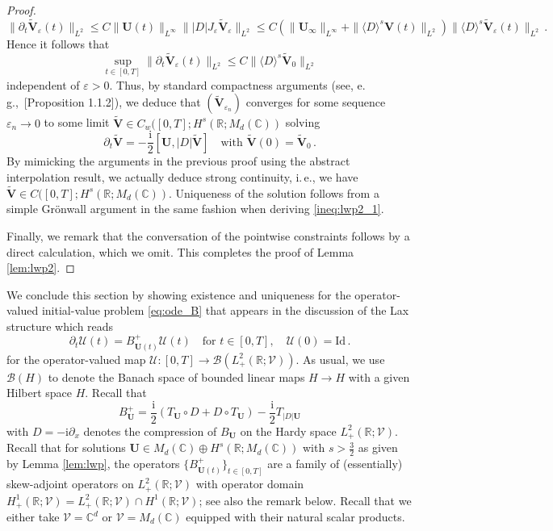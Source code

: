 \documentclass[11pt,reqno]{amsart}
\theoremstyle{definition}
\theoremstyle{remark}
\theoremstyle{remark}
\numberwithin{equation}{section}
\newcommand{\C}{\mathbb{C}}
\newcommand{\R}{\mathbb{R}}
\newcommand{\UU}{\mathcal{U}}
\newcommand{\VV}{\mathcal{V}}
\newcommand{\pt}{\partial}
\newcommand{\be}{\begin{equation}}
\newcommand{\ee}{\end{equation}}
\newcommand{\eps}{\varepsilon}
\newcommand{\ii}{\mathrm{i}}
\newcommand{\Vb}{\mathbf{V}}
\newcommand{\Ub}{\mathbf{U}}
\newcommand{\id}{\mathrm{Id}}
\newcommand{\Dsr}{\langle D \rangle}
\begin{document}
\begin{appendix}
\begin{proof}
$$
\| \pt_t \widetilde{\Vb}_\eps(t) \|_{L^2} \leq C \| \Ub(t) \|_{L^\infty} \| |D| J_\eps \widetilde{\Vb}_\eps \|_{L^2} \leq C \left ( \| \Ub_\infty \|_{L^\infty} + \| \Dsr^s \Vb(t) \|_{L^2} \right ) \| \Dsr^s \widetilde{\Vb}_\eps(t) \|_{L^2} \, .
$$
Hence it follows that
$$
\sup_{t \in [0,T]} \| \pt_t \widetilde{\Vb}_\eps(t) \|_{L^2} \leq C \| \Dsr^s \widetilde{\Vb}_0 \|_{L^2}
$$
independent of $\eps > 0$. Thus, by standard compactness arguments (see, e.\,g.,~\cite{Ca-03}[Proposition 1.1.2]), we deduce that $(\widetilde{\Vb}_{\eps_n})$ converges for some sequence $\eps_n \to 0$ to some limit $\widetilde{\Vb} \in C_w([0,T]; H^s(\R; M_d(\C))$ solving 
$$
\pt_t \widetilde{\Vb} = -\frac{\ii}{2} [ \Ub, |D| \widetilde{\Vb} ] \quad \mbox{with $\widetilde{\Vb}(0) = \widetilde{\Vb}_0$} \, .
$$
By mimicking the arguments in the previous proof using the abstract interpolation result, we actually deduce strong continuity, i.\,e., we have $\widetilde{\Vb} \in C([0,T]; H^s(\R; M_d(\C))$. Uniqueness of  the solution follows from a simple Gr\"onwall argument in the same fashion when deriving \eqref{ineq:lwp2_1}.

Finally, we remark that the conversation of the pointwise constraints follows by a direct calculation, which we omit. This completes the proof of Lemma \ref{lem:lwp2}.
\end{proof}

\medskip
We conclude this section by showing existence and uniqueness for the operator-valued initial-value problem \eqref{eq:ode_B} that appears in the discussion of the Lax structure which reads
\be \label{eq:ode_lax_app}
\pt_t \UU(t) = B_{\Ub(t)}^+ \UU(t) \quad \mbox{for $t \in [0,T]$}, \quad \UU(0) = \id \, .
\ee 
for the operator-valued map $\UU : [0,T] \to \mathcal{B}(L^2_+(\R; \VV))$. As usual, we use $\mathcal{B}(H)$ to denote the Banach space of bounded linear maps $H \to H$ with a given Hilbert space $H$. Recall that 
\be
B_{\Ub}^+ = \frac{\ii}{2} \left ( T_\Ub \circ D + D \circ T_\Ub \right )  - \frac{\ii}{2} T_{|D| \Ub}
\ee
with $D = -\ii \pt_x$ denotes the compression of $B_\Ub$ on the Hardy space $L^2_+(\R; \VV)$. Recall that for solutions $\Ub \in M_d(\C) \oplus H^s(\R; M_d(\C))$ with $s > \frac{3}{2}$ as given by Lemma \ref{lem:lwp}, the operators $\{ B^+_{\Ub(t)} \}_{t \in [0,T]}$ are a family of (essentially) skew-adjoint operators on $L^2_+(\R; \VV)$ with operator domain $H^1_+(\R;\VV) = L^2_+(\R; \VV) \cap H^1(\R; \VV)$; see also the remark below. Recall that we either take $\VV= \C^d$ or $\VV = M_d(\C)$ equipped with their natural scalar products.



\end{appendix}
\end{document}

